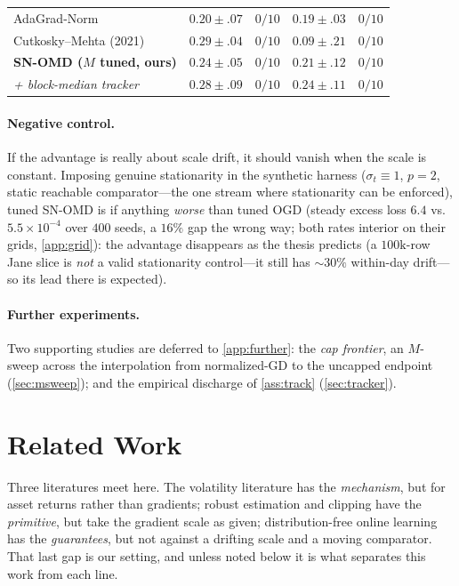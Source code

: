 \documentclass{article}
\begin{document}
\begin{table}[t]
\begin{small}
\begin{tabular}{lcccc}
AdaGrad-Norm                           & $0.20\pm.07$ & $0/10$ & $0.19\pm.03$ & $0/10$ \\
Cutkosky--Mehta (2021)                 & $\mathbf{0.29}\pm.04$ & $0/10$ & $0.09\pm.21$ & $0/10$ \\
\textbf{SN-OMD ($M$ tuned, ours)}      & $0.24\pm.05$ & $0/10$ & $0.21\pm.12$ & $0/10$ \\
\quad\emph{+ block-median tracker}     & $0.28\pm.09$ & $0/10$ & $\mathbf{0.24}\pm.11$ & $0/10$ \\
\bottomrule
\end{tabular}
\end{small}
\end{table}

\paragraph{Negative control.} If the advantage is really about scale drift, it should
vanish when the scale is constant. Imposing genuine stationarity in the synthetic harness
($\sigma_t\equiv1$, $p{=}2$, static reachable comparator---the one stream where
stationarity can be enforced), tuned SN-OMD is if anything \emph{worse} than tuned OGD
(steady excess loss $6.4$ vs.\ $5.5\!\times\!10^{-4}$ over $400$ seeds, a $16\%$ gap the
wrong way; both rates interior on their grids, \cref{app:grid}): the advantage disappears as the thesis
predicts (a $100\mathrm{k}$-row Jane slice is \emph{not} a valid stationarity control---it
still has $\sim30\%$ within-day drift---so its lead there is expected).

\paragraph{Further experiments.} Two supporting studies are deferred to
\cref{app:further}: the \emph{cap frontier}, an $M$-sweep across the interpolation from
normalized-GD to the uncapped endpoint (\cref{sec:msweep}); and the empirical discharge of
\cref{ass:track} (\cref{sec:tracker}).

\section{Related Work}
\label{sec:related}

Three literatures meet here. The volatility literature has the \emph{mechanism}, but for asset
returns rather than gradients; robust estimation and clipping have the \emph{primitive}, but
take the gradient scale as given; distribution-free online learning has the \emph{guarantees},
but not against a drifting scale and a moving comparator. That last gap is our setting, and
unless noted below it is what separates this work from each line.
\end{document}
